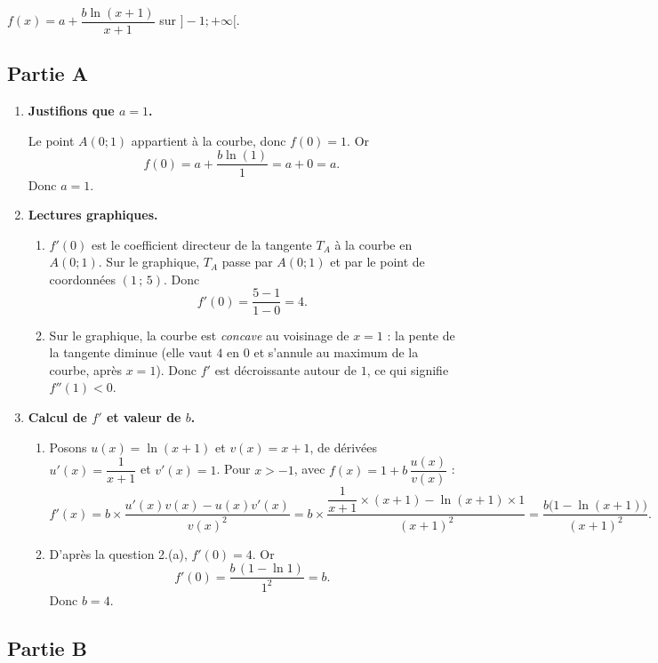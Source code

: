 \documentclass[11pt,a4paper]{article}
\begin{document}
$f(x) = a + \dfrac{b\ln(x+1)}{x+1}$ sur $]-1;+\infty[$.

\subsection*{Partie A}

\begin{enumerate}

\item \textbf{Justifions que $a=1$.}

Le point $A(0;1)$ appartient à la courbe, donc $f(0)=1$. Or
\[
f(0) = a + \dfrac{b\ln(1)}{1} = a + 0 = a.
\]
Donc $a = 1$.

\item \textbf{Lectures graphiques.}

\begin{enumerate}
\item $f'(0)$ est le coefficient directeur de la tangente $T_A$ à la courbe en $A(0;1)$.
Sur le graphique, $T_A$ passe par $A(0;1)$ et par le point de coordonnées $(1\,;\,5)$. Donc
\[
f'(0) = \dfrac{5-1}{1-0} = 4.
\]

\item Sur le graphique, la courbe est \emph{concave} au voisinage de $x=1$ : la pente de la tangente
diminue (elle vaut $4$ en $0$ et s'annule au maximum de la courbe, après $x=1$).
Donc $f'$ est décroissante autour de $1$, ce qui signifie $f''(1) < 0$.
\end{enumerate}

\item \textbf{Calcul de $f'$ et valeur de $b$.}

\begin{enumerate}
\item Posons $u(x)=\ln(x+1)$ et $v(x)=x+1$, de dérivées $u'(x)=\dfrac{1}{x+1}$ et $v'(x)=1$.
Pour $x>-1$, avec $f(x)=1+b\,\dfrac{u(x)}{v(x)}$ :
\[
f'(x) = b\times\dfrac{u'(x)v(x)-u(x)v'(x)}{v(x)^2}
= b\times\dfrac{\dfrac{1}{x+1}\times(x+1) - \ln(x+1)\times 1}{(x+1)^2}
= \dfrac{b\bigl(1-\ln(x+1)\bigr)}{(x+1)^2}.
\]

\item D'après la question 2.(a), $f'(0)=4$. Or
\[
f'(0) = \dfrac{b\,(1-\ln 1)}{1^2} = b.
\]
Donc $b = 4$.
\end{enumerate}

\end{enumerate}

\subsection*{Partie B}
\end{document}
